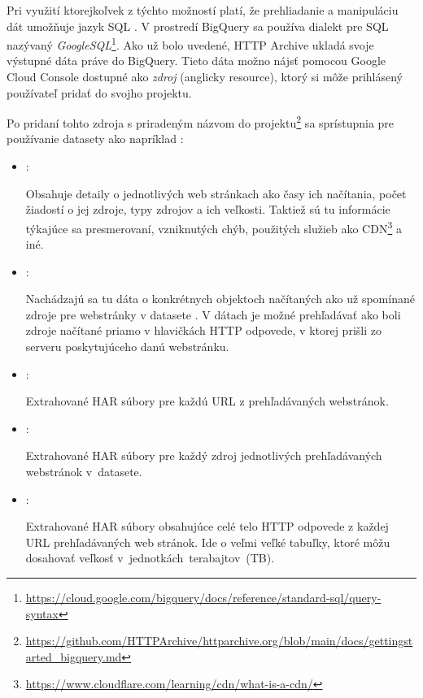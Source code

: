 Pri využití ktorejkoľvek z týchto možností platí, že prehliadanie a manipuláciu dát umožňuje jazyk SQL \cite{google-bq}.
V prostredí BigQuery sa používa dialekt pre SQL nazývaný \emph{GoogleSQL}\footnote{\url{https://cloud.google.com/bigquery/docs/reference/standard-sql/query-syntax}}.
Ako už bolo uvedené, HTTP Archive ukladá svoje výstupné dáta práve do BigQuery.
Tieto dáta možno nájsť pomocou Google Cloud Console dostupné ako \textit{zdroj} (anglicky resource), ktorý si môže prihlásený používateľ pridať do svojho projektu.

\pagebreak

\noindent Po pridaní tohto zdroja s priradeným názvom  do projektu\footnote{\url{https://github.com/HTTPArchive/httparchive.org/blob/main/docs/gettingstarted\_bigquery.md}} sa sprístupnia pre používanie datasety ako napríklad \cite{httparchive-repo}:

\begin{itemize}
    \item {}:

    Obsahuje detaily o jednotlivých web stránkach ako časy ich načítania, počet žiadostí o jej zdroje, typy zdrojov a ich veľkosti.
    Taktiež sú tu informácie týkajúce sa presmerovaní, vzniknutých chýb, použitých služieb ako CDN\footnote{\url{https://www.cloudflare.com/learning/cdn/what-is-a-cdn/}} a iné.
    
    \item {}:

    Nachádzajú sa tu dáta o konkrétnych objektoch načítaných ako už spomínané zdroje pre webstránky v datasete .
    V dátach je možné prehľadávať ako boli zdroje načítané priamo v hlavičkách HTTP odpovede, v ktorej prišli zo serveru poskytujúceho danú webstránku.
    
    \item {}:

    Extrahované HAR súbory pre každú URL z prehľadávaných webstránok.
    
    \item {}:

    Extrahované HAR súbory pre každý zdroj jednotlivých prehľadávaných webstránok \mbox{v  datasete}.
    
    \item {}:

    Extrahované HAR súbory obsahujúce celé telo HTTP odpovede z každej URL prehľadávaných web stránok.
    Ide o veľmi veľké tabuľky, ktoré môžu dosahovať veľkosť \mbox{v jednotkách terabajtov (TB)}.
\end{itemize}

